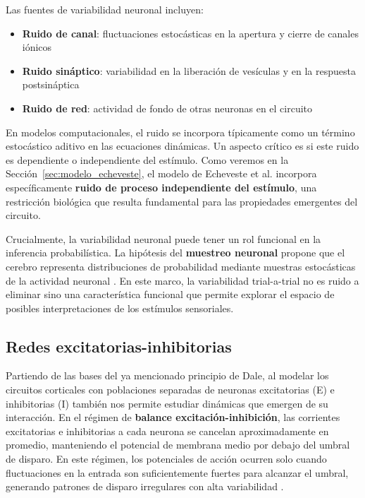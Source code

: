 Las fuentes de variabilidad neuronal incluyen:

\begin{itemize}
    \item \textbf{Ruido de canal}: fluctuaciones estocásticas en la apertura y cierre de canales iónicos
    \item \textbf{Ruido sináptico}: variabilidad en la liberación de vesículas y en la respuesta postsináptica
    \item \textbf{Ruido de red}: actividad de fondo de otras neuronas en el circuito
\end{itemize}

En modelos computacionales, el ruido se incorpora típicamente como un término estocástico aditivo en las ecuaciones dinámicas. Un aspecto crítico es si este ruido es dependiente o independiente del estímulo. Como veremos en la Sección~\ref{sec:modelo_echeveste}, el modelo de Echeveste et al. incorpora específicamente \textbf{ruido de proceso independiente del estímulo}, una restricción biológica que resulta fundamental para las propiedades emergentes del circuito.

Crucialmente, la variabilidad neuronal puede tener un rol funcional en la inferencia probabilística. La hipótesis del \textbf{muestreo neuronal} propone que el cerebro representa distribuciones de probabilidad mediante muestras estocásticas de la actividad neuronal \citep{echeveste2020cortical}. En este marco, la variabilidad trial-a-trial no es ruido a eliminar sino una característica funcional que permite explorar el espacio de posibles interpretaciones de los estímulos sensoriales.

\subsection{Redes excitatorias-inhibitorias}
\label{subsec:redes_ei}

Partiendo de las bases del ya mencionado principio de Dale, al modelar los circuitos corticales con poblaciones separadas de neuronas excitatorias (E) e inhibitorias (I) también nos permite estudiar dinámicas que emergen de su interacción. En el régimen de \textbf{balance excitación-inhibición}, las corrientes excitatorias e inhibitorias a cada neurona se cancelan aproximadamente en promedio, manteniendo el potencial de membrana medio por debajo del umbral de disparo. En este régimen, los potenciales de acción ocurren solo cuando fluctuaciones en la entrada son suficientemente fuertes para alcanzar el umbral, generando patrones de disparo irregulares con alta variabilidad \citep{dayan2005theoretical}.


